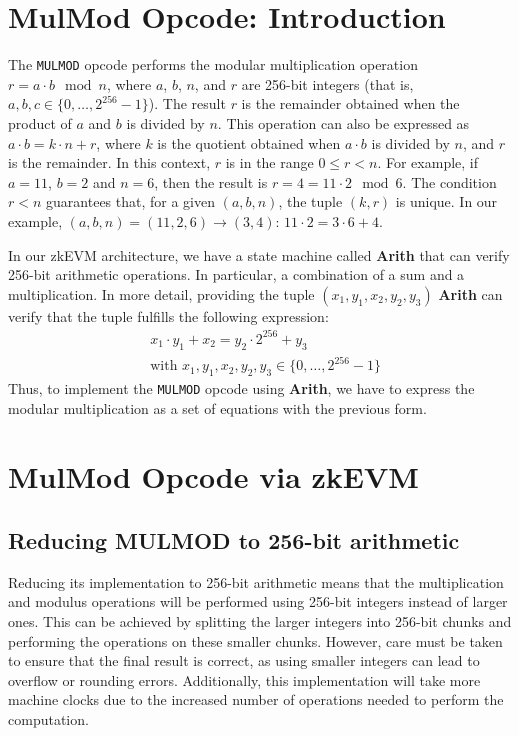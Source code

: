 

\section{MulMod Opcode: Introduction}

The \texttt{MULMOD} opcode performs the modular multiplication operation $r = a \cdot b \mod{n}$, where $a$, $b$, $n$, and $r$ are 256-bit integers (that is, $a, b, c \in \{0, \dots, 2^{256}-1\}$). The result $r$ is the remainder obtained when the product of $a$ and $b$ is divided by $n$. This operation can also be expressed as $a \cdot b = k \cdot n + r$, where $k$ is the quotient obtained when $a \cdot b$ is divided by $n$, and $r$ is the remainder. In this context, $r$ is in the range $0 \leq r < n$. For example, if $a = 11$, $b = 2$ and $n = 6$, then the result is $r = 4 = 11 \cdot 2 \mod{6}$. The condition $r<n$ guarantees that, for a given $(a,b,n)$, the tuple $(k,r)$ is unique. In our example, $(a,b,n)=(11,2,6) \rightarrow (3,4)$:  $11 \cdot 2 = 3 \cdot 6 + 4$.

In our zkEVM architecture, we have a state machine called \textbf{Arith} that can verify 256-bit arithmetic operations. In particular, a combination of a sum and a multiplication. In more detail, providing the tuple $(x_1, y_1, x_2, y_2, y_3)$ \textbf{Arith} can verify that the tuple fulfills the following expression:
\begin{align*}
&x_1 \cdot y_1+x_2 = y_2 \cdot 2^{256} + y_3\\
&\text{with } x_1, y_1, x_2, y_2, y_3 \in \{0, \dots, 2^{256}-1\}
\end{align*}
Thus, to implement the \texttt{MULMOD} opcode using \textbf{Arith}, we have to express the modular multiplication as a set 
of equations with the previous form.



\section{MulMod Opcode via zkEVM }

\subsection{Reducing MULMOD to 256-bit arithmetic}

Reducing its implementation to 256-bit arithmetic means that the multiplication and modulus operations will be performed using 256-bit integers instead of larger ones. This can be achieved by splitting the larger integers into 256-bit chunks and performing the operations on these smaller chunks. However, care must be taken to ensure that the final result is correct, as using smaller integers can lead to overflow or rounding errors. Additionally, this implementation will take more machine clocks due to the increased number of operations needed to perform the computation.

